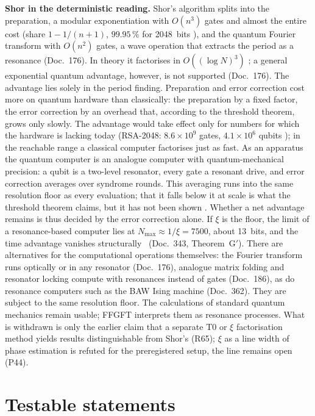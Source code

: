 \textbf{Shor in the deterministic reading.} Shor's algorithm splits into the preparation, a
modular exponentiation with $O(n^3)$ gates and almost the entire cost (share $1-1/(n+1)$, $99.95\,\%$ for
2048~bits \KM), and the quantum Fourier
transform with $O(n^2)$ gates, a wave operation that extracts the period as a resonance
(Doc.~176). In theory it factorises in $O((\log N)^3)$ \KM; a general exponential quantum
advantage, however, is not supported (Doc.~176). The advantage lies solely in the period finding.
Preparation and error correction cost more on quantum hardware than classically: the preparation
by a fixed factor, the error correction by an overhead that, according to the threshold theorem,
grows only slowly. The advantage would take effect only for numbers for which the hardware is
lacking today (RSA-2048: $8.6\times10^9$ gates, $4.1\times10^6$ qubits \KM); in the reachable range a
classical computer factorises just as fast. As an apparatus the quantum computer is an analogue
computer with quantum-mechanical precision: a qubit is a two-level resonator, every gate a
resonant drive, and error correction averages over syndrome rounds. This averaging runs into the
same resolution floor as every evaluation; that it falls below it at scale is what the threshold
theorem claims, but it has not been shown \SM. Whether a net advantage remains is thus decided by
the error correction alone. If $\xi$ is the floor, the limit of a resonance-based computer lies
at $N_\mathrm{max}\approx1/\xi=7500$, about 13~bits, and the time advantage vanishes structurally
\SM\ (Doc.~343, Theorem~G$'$).
There are alternatives for the computational operations themselves: the Fourier transform runs
optically or in any resonator (Doc.~176), analogue matrix folding and resonator locking compute
with resonances instead of gates (Doc.~186), as do resonance computers such as the BAW Ising
machine (Doc.~362). They are subject to the same resolution floor. The calculations of standard
quantum mechanics remain usable; FFGFT interprets them as resonance processes. What is withdrawn
is only the earlier claim that a separate T0 or $\xi$ factorisation method yields results
distinguishable from Shor's (R65); $\xi$ as a line width of phase estimation is refuted for the
preregistered setup, the line remains open (P44).

\section{Testable statements}

